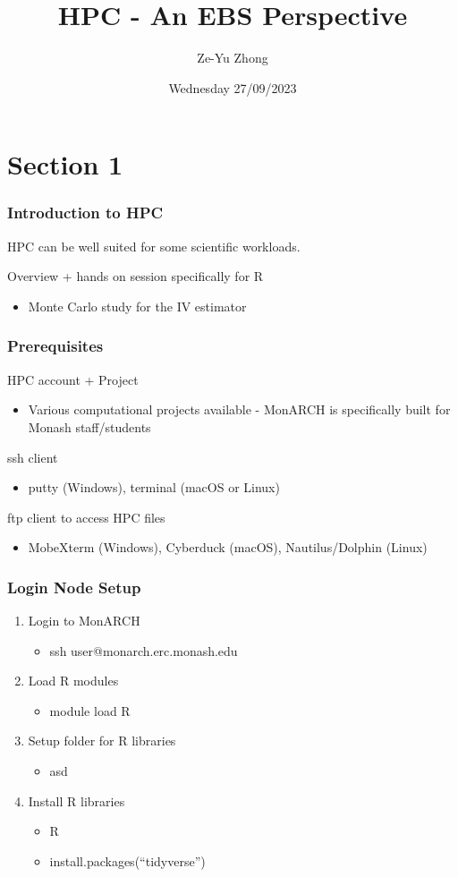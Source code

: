 \documentclass[aspectratio=169,notheorems]{beamer}
\title{HPC - An EBS Perspective}
\author[]{Ze-Yu Zhong
}
\date{Wednesday 27/09/2023}
\theoremstyle{plain}
\theoremstyle{plain}
\numberwithin{equation}{section}
\begin{document}
\begin{frame}
\titlepage
\end{frame}

\section{Section 1}
\begin{frame}
\frametitle{Introduction to HPC}
HPC can be well suited for some scientific workloads.

Overview + hands on session specifically for R
\begin{itemize}
\item Monte Carlo study for the IV estimator
\end{itemize}
\end{frame}

\begin{frame}
\frametitle{Prerequisites}
HPC account + Project
\begin{itemize}
\item Various computational projects available - MonARCH is specifically built for Monash staff/students
\end{itemize}
ssh client
\begin{itemize}
\item putty (Windows), terminal (macOS or Linux)
\end{itemize}
ftp client to access HPC files
\begin{itemize}
\item MobeXterm (Windows), Cyberduck (macOS), Nautilus/Dolphin (Linux)
\end{itemize}
\end{frame}

\begin{frame}
\frametitle{Login Node Setup}
\begin{enumerate}
\item Login to MonARCH
	\begin{itemize}
	\item ssh user@monarch.erc.monash.edu
	\end{itemize}
\item Load R modules
	\begin{itemize}
	\item module load R
	\end{itemize}
\item Setup folder for R libraries
	\begin{itemize}
	\item asd
	\end{itemize}
\item Install R libraries
	\begin{itemize}
	\item R
	\item install.packages(``tidyverse'')
	\end{itemize}
\end{enumerate}
\end{frame}
\end{document}
